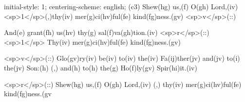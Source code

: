 initial-style: 1;
centering-scheme: english;
(c3) Shew(hg) us,(f) O(gh) Lord,(iv) <sp>1</sp>(,)thy(iv) mer(g)ci(hv)ful(fe) kind(fg)ness.(gv) <sp>v</sp>(::)

And(e) grant(fh) us(hv) thy(g) sal(f)va(gh)tion.(iv) <sp>r</sp>(::) <sp>1</sp> Thy(iv) mer(g)ci(hv)ful(fe) kind(fg)ness.(gv)

<sp>v</sp>(::) Glo(gv)ry(iv) be(iv) to(iv) the(iv) Fa(ij)ther(jv) and(jv) to(i) the(jv) Son:(h) (,) and(h) to(h) the(g) Ho(f)ly(gv) Spir(hi)it.(iv)

<sp>r</sp>(::)  Shew(hg) us,(f) O(gh) Lord,(iv) (,) thy(iv) mer(g)ci(hv)ful(fe) kind(fg)ness.(gv